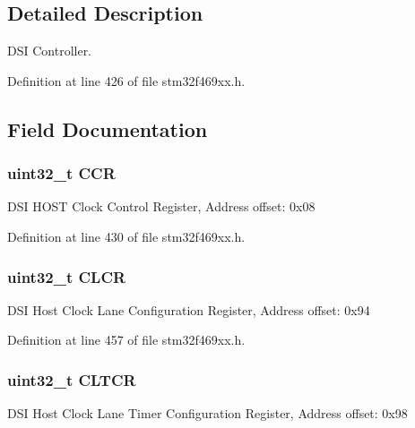 \subsection{Detailed Description}
D\+SI Controller. 

Definition at line 426 of file stm32f469xx.\+h.



\subsection{Field Documentation}
\subsubsection[{\texorpdfstring{C\+CR}{CCR}}]{ uint32\+\_\+t C\+CR}\hypertarget{struct_d_s_i___type_def_a5e1322e27c40bf91d172f9673f205c97}{}\label{struct_d_s_i___type_def_a5e1322e27c40bf91d172f9673f205c97}
D\+SI H\+O\+ST Clock Control Register, Address offset\+: 0x08 

Definition at line 430 of file stm32f469xx.\+h.

\subsubsection[{\texorpdfstring{C\+L\+CR}{CLCR}}]{ uint32\+\_\+t C\+L\+CR}\hypertarget{struct_d_s_i___type_def_a8ee3caa69ce871e68d1ca66a8640a9a9}{}\label{struct_d_s_i___type_def_a8ee3caa69ce871e68d1ca66a8640a9a9}
D\+SI Host Clock Lane Configuration Register, Address offset\+: 0x94 

Definition at line 457 of file stm32f469xx.\+h.

\subsubsection[{\texorpdfstring{C\+L\+T\+CR}{CLTCR}}]{ uint32\+\_\+t C\+L\+T\+CR}\hypertarget{struct_d_s_i___type_def_ae46f5a0bfdbaa03ce98672c3fa65730d}{}\label{struct_d_s_i___type_def_ae46f5a0bfdbaa03ce98672c3fa65730d}
D\+SI Host Clock Lane Timer Configuration Register, Address offset\+: 0x98 

